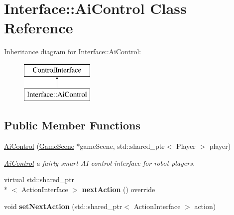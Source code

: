 \hypertarget{class_interface_1_1_ai_control}{\section{Interface\-:\-:Ai\-Control Class Reference}
\label{class_interface_1_1_ai_control}
}
Inheritance diagram for Interface\-:\-:Ai\-Control\-:\begin{figure}[H]
\begin{center}
\leavevmode
\includegraphics[height=2.000000cm]{class_interface_1_1_ai_control}
\end{center}
\end{figure}
\subsection*{Public Member Functions}
\begin{DoxyCompactItemize}
\item 
\hyperlink{class_interface_1_1_ai_control_ab4222b9a49b5de92f222846b9bc1986d}{Ai\-Control} (\hyperlink{class_game_scene}{Game\-Scene} $\ast$game\-Scene, std\-::shared\-\_\-ptr$<$ Player $>$ player)
\begin{DoxyCompactList}\small\item\em \hyperlink{class_interface_1_1_ai_control}{Ai\-Control} a fairly smart A\-I control interface for robot players. \end{DoxyCompactList}\item 
\hypertarget{class_interface_1_1_ai_control_a4200c53fe695f626e8c0996a87ef6fae}{virtual std\-::shared\-\_\-ptr\\*
$<$ Action\-Interface $>$ {\bfseries next\-Action} () override}\label{class_interface_1_1_ai_control_a4200c53fe695f626e8c0996a87ef6fae}

\item 
\hypertarget{class_interface_1_1_ai_control_a983422e81dffbebb309d58ca3c594a0d}{void {\bfseries set\-Next\-Action} (std\-::shared\-\_\-ptr$<$ Action\-Interface $>$ action)}\label{class_interface_1_1_ai_control_a983422e81dffbebb309d58ca3c594a0d}

\end{DoxyCompactItemize}


